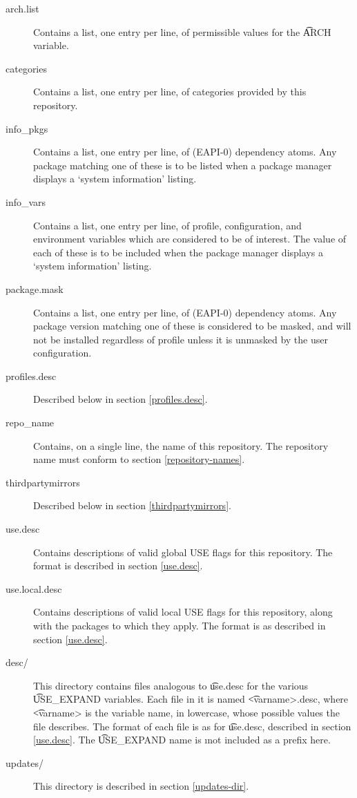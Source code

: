 \begin{description}
\item[arch.list] \label{arch.list} Contains a list, one entry per line, of permissible values for
    the \t{ARCH} variable.
\item[categories] \label{profiles-categories} Contains a list, one entry per line, of categories
    provided by this repository.
\item[info\_pkgs] Contains a list, one entry per line, of (EAPI-0) dependency atoms. Any package
    matching one of these is to be listed when a package manager displays a `system information'
    listing.
\item[info\_vars] Contains a list, one entry per line, of profile, configuration, and environment
    variables which are considered to be of interest. The value of each of these is to be included
    when the package manager displays a `system information' listing.
\item[package.mask] \label{profiles-package.mask}
    Contains a list, one entry per line, of (EAPI-0) dependency atoms. Any package
    version matching one of these is considered to be masked, and will not be installed regardless
    of profile unless it is unmasked by the user configuration.
\item[profiles.desc] Described below in section \ref{profiles.desc}.
\item[repo\_name] Contains, on a single line, the name of this repository. The repository name must
    conform to section \ref{repository-names}.
\item[thirdpartymirrors] Described below in section \ref{thirdpartymirrors}.
\item[use.desc] Contains descriptions of valid global USE flags for this repository. The format is
    described in section \ref{use.desc}.
\item[use.local.desc] Contains descriptions of valid local USE flags for this repository, along with
    the packages to which they apply. The format is as described in section \ref{use.desc}.
\item[desc/] This directory contains files analogous to \t{use.desc} for the various \t{USE\_EXPAND}
    variables. Each file in it is named \t{<varname>.desc}, where \t{<varname>} is the variable
    name, in lowercase, whose possible values the file describes. The format of each file is as for
    \t{use.desc}, described in section \ref{use.desc}. The \t{USE\_EXPAND} name is \i{not}
    included as a prefix here.
\item[updates/] This directory is described in section \ref{updates-dir}.
\end{description}

